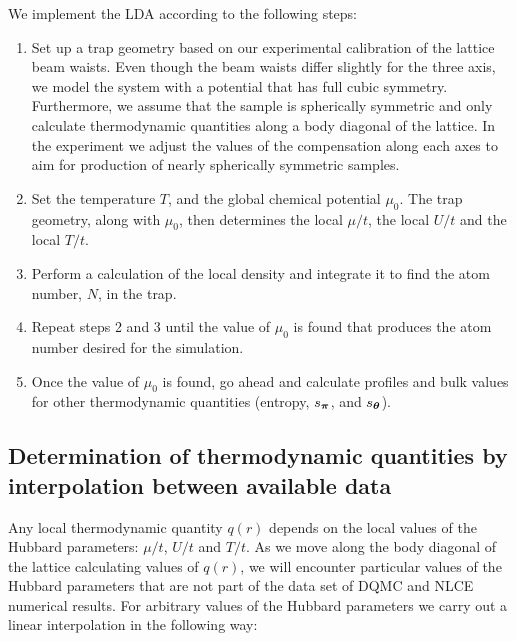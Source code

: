 We implement the LDA according to the following steps: 
\begin{enumerate}

  \item Set up a trap geometry based on our experimental calibration of the
lattice beam waists.  Even though the beam waists differ slightly for the three
axis, we model the system with a potential that has full cubic symmetry.
Furthermore, we assume that the sample is spherically symmetric and only
calculate thermodynamic quantities along a body diagonal of the lattice. In the
experiment we adjust the values of the compensation along each axes to aim for
production of nearly spherically symmetric samples. 

 \item  Set the temperature $T$, and the global chemical potential $\mu_{0}$.
The trap geometry, along with $\mu_{0}$, then determines the local $\mu/t$, the
local $U/t$ and the local $T/t$. 

  \item Perform a calculation of the local density and integrate it to find the atom number, $N$, in the trap. 

  \item Repeat steps 2 and 3 until the value of $\mu_{0}$ is found that
produces the atom number desired for the simulation. 

  \item Once the value of $\mu_{0}$ is found, go ahead and calculate profiles
and bulk values for other thermodynamic quantities (entropy, $s_{\bm{\pi}}$,
and $s_{\bm{\theta}}$).

\end{enumerate}

\subsection{ Determination of thermodynamic quantities by interpolation between
available data}

Any local thermodynamic quantity $q(r)$ depends on the local values of the
Hubbard parameters: $\mu/t$, $U/t$ and $T/t$.  As we move along the body
diagonal of the lattice calculating values of $q(r)$, we will encounter
particular values of the Hubbard parameters that are not part of the data set
of DQMC and NLCE numerical results.   For arbitrary values of the Hubbard
parameters we carry out a linear interpolation in the following way:

